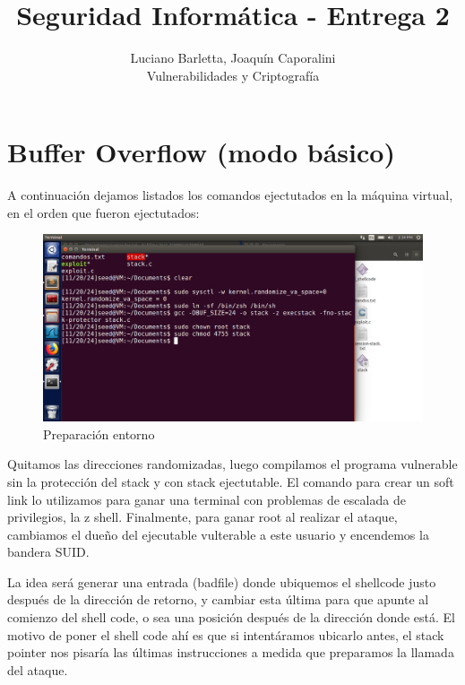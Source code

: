 \documentclass[12pt]{article}
\begin{document}
 
 
\title{Seguridad Informática - Entrega 2}
\author{Luciano Barletta, Joaquín Caporalini\\ %
Vulnerabilidades y Criptografía}

\maketitle

\section*{Buffer Overflow (modo básico)}

A continuación dejamos listados los comandos ejectutados en la máquina virtual, en el orden que fueron ejectutados:

\begin{figure}[!h]
    \centering
    \includegraphics[width=0.9\linewidth]{primerosComandos.png}
    \caption{Preparación entorno}
    \label{fig:enter-label}
\end{figure}

Quitamos las direcciones randomizadas, luego compilamos el programa vulnerable sin la protección del stack y con stack ejectutable. El comando para crear un soft link lo utilizamos para ganar una terminal con problemas de escalada de privilegios, la z shell. Finalmente, para ganar root al realizar el ataque, cambiamos el dueño del ejecutable vulterable a este usuario y encendemos la bandera SUID.

La idea será generar una entrada (badfile) donde ubiquemos el shellcode justo después de la dirección de retorno, y cambiar esta última para que apunte al comienzo del shell code, o sea una posición después de la dirección donde está. El motivo de poner el shell code ahí es que si intentáramos ubicarlo antes, el stack pointer nos pisaría las últimas instrucciones a medida que preparamos la llamada del ataque.
\end{document}
